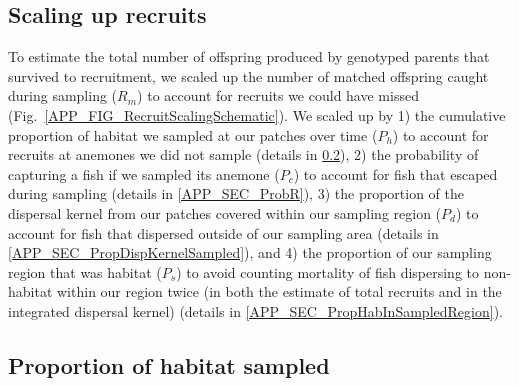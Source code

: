 \documentclass[12pt, oneside]{article}   	%
\begin{document}


\subsection{Scaling up recruits}

To estimate the total number of offspring produced by genotyped parents that survived to recruitment, we scaled up the number of matched offspring caught during sampling ($R_m$) to account for recruits we could have missed (Fig.\ \ref{APP_FIG_RecruitScalingSchematic}). We scaled up by 1) the cumulative proportion of habitat we sampled at our patches over time ($P_h$) to account for recruits at anemones we did not sample (details in \ref{APP_SEC_ProbHabSampled}), 2) the probability of capturing a fish if we sampled its anemone ($P_c$) to account for fish that escaped during sampling (details in \ref{APP_SEC_ProbR}), 3) the proportion of the dispersal kernel from our patches covered within our sampling region ($P_d$) to account for fish that dispersed outside of our sampling area (details in \ref{APP_SEC_PropDispKernelSampled}), and 4) the proportion of our sampling region that was habitat ($P_s$) to avoid counting mortality of fish dispersing to non-habitat within our region twice (in both the estimate of total recruits and in the integrated dispersal kernel) (details in \ref{APP_SEC_PropHabInSampledRegion}). %

\subsection{Proportion of habitat sampled} \label{APP_SEC_ProbHabSampled}
\end{document}

